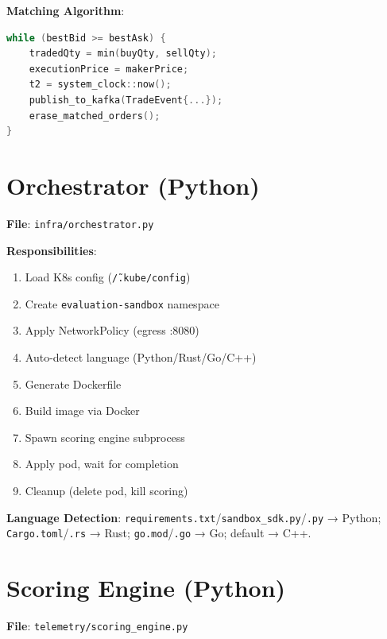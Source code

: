 \documentclass[10pt,a4paper,oneside]{report}
\begin{document}
\textbf{Matching Algorithm}:
\begin{lstlisting}[language=cpp]
while (bestBid >= bestAsk) {
    tradedQty = min(buyQty, sellQty);
    executionPrice = makerPrice;
    t2 = system_clock::now();
    publish_to_kafka(TradeEvent{...});
    erase_matched_orders();
}
\end{lstlisting}

\section{Orchestrator (Python)}

\textbf{File}: \texttt{infra/orchestrator.py}

\textbf{Responsibilities}:
\begin{enumerate}
    \item Load K8s config (\texttt{\~/.kube/config})
    \item Create \texttt{evaluation-sandbox} namespace
    \item Apply NetworkPolicy (egress :8080)
    \item Auto-detect language (Python/Rust/Go/C++)
    \item Generate Dockerfile
    \item Build image via Docker
    \item Spawn scoring engine subprocess
    \item Apply pod, wait for completion
    \item Cleanup (delete pod, kill scoring)
\end{enumerate}

\textbf{Language Detection}: \texttt{requirements.txt}/\texttt{sandbox\_sdk.py}/\texttt{.py} → Python; \texttt{Cargo.toml}/\texttt{.rs} → Rust; \texttt{go.mod}/\texttt{.go} → Go; default → C++.

\section{Scoring Engine (Python)}

\textbf{File}: \texttt{telemetry/scoring\_engine.py}
\end{document}
